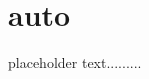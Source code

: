 \newpage
{}
%
\section[{\tt auto}]{{\SecCode auto}}\label{auto-feature}


placeholder text.........


